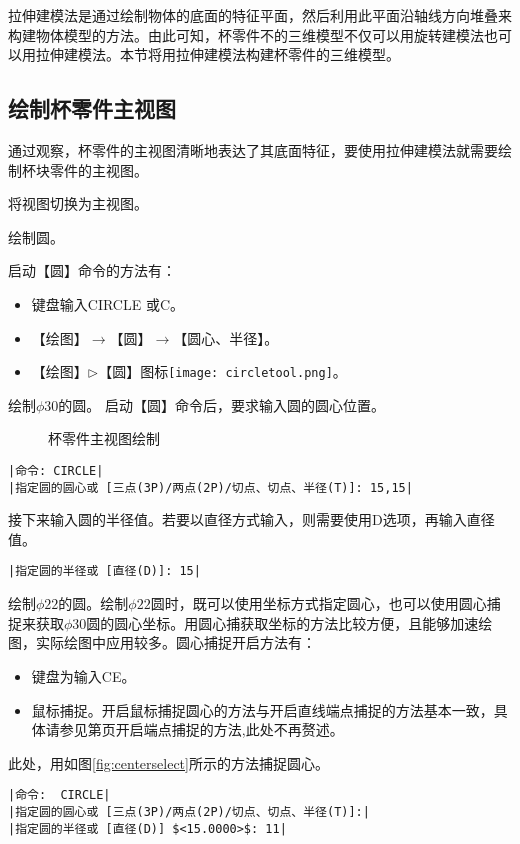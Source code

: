 拉伸建模法是通过绘制物体的底面的特征平面，然后利用此平面沿轴线方向堆叠来构建物体模型的方法。由此可知，杯零件不的三维模型不仅可以用旋转建模法也可以用拉伸建模法。本节将用拉伸建模法构建杯零件的三维模型。
\subsection{绘制杯零件主视图}
通过观察，杯零件的主视图清晰地表达了其底面特征，要使用拉伸建模法就需要绘制杯块零件的主视图。
\begin{procedure}
\item 将视图切换为主视图。
\item 绘制圆。

启动【圆】命令的方法有：
\begin{itemize}
\item 键盘输入CIRCLE 或C。
\item 【绘图】$\rightarrow$【圆】$\rightarrow$【圆心、半径】。
\item 【绘图】$\triangleright$【圆】图标\texttt{[image: circletool.png]}。
\end{itemize}

绘制$\phi 30$的圆。
启动【圆】命令后，要求输入圆的圆心位置。
\begin{figure}[htbp]
\centering
{}\hspace{20pt}
\caption{杯零件主视图绘制}
\end{figure}
\begin{lstlisting}
|命令: CIRCLE|
|指定圆的圆心或 [三点(3P)/两点(2P)/切点、切点、半径(T)]: 15,15|
\end{lstlisting}
接下来输入圆的半径值。若要以直径方式输入，则需要使用D选项，再输入直径值。
\begin{lstlisting}
|指定圆的半径或 [直径(D)]: 15|
\end{lstlisting}
绘制$\phi 22$的圆。绘制$\phi 22$圆时，既可以使用坐标方式指定圆心，也可以使用圆心捕捉来获取$\phi 30$圆的圆心坐标。用圆心捕获取坐标的方法比较方便，且能够加速绘图，实际绘图中应用较多。圆心捕捉开启方法有：
\begin{itemize}
\item 键盘为输入CE。
\item 鼠标捕捉。开启鼠标捕捉圆心的方法与开启直线端点捕捉的方法基本一致，具体请参见第\pageref{fig:duixiangbuzuomen2}页开启端点捕捉的方法,此处不再赘述。
\end{itemize}
 此处，用如图\ref{fig:centerselect}所示的方法捕捉圆心。
\begin{lstlisting}
|命令:  CIRCLE|
|指定圆的圆心或 [三点(3P)/两点(2P)/切点、切点、半径(T)]:|
|指定圆的半径或 [直径(D)] $<15.0000>$: 11|
\end{lstlisting}

\end{procedure}

\endinput